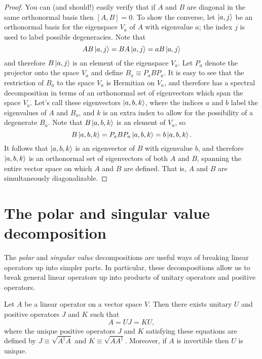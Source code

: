 \begin{proof}
  You can (and should!) easily verify that if $A$ and $B$ are diagonal in the
  same orthonormal basis then $[A, B] = 0$. To show the converse, let $\ket{a,
  j}$ be an orthonormal basis for the eigenspace $V_a$ of $A$ with eigenvalue
  $a$; the index $j$ is used to label possible degeneracies. Note that
  \begin{equation*}
    AB\ket{a, j} = BA\ket{a, j} = aB\ket{a, j}
  \end{equation*}
  and therefore $B\ket{a, j}$ is an element of the eigenspace $V_a$. Let $P_a$
  denote the projector onto the space $V_a$ and define $B_a \equiv P_aBP_a$.
  It is easy to see that the restriction of $B_a$ to the space $V_a$ is
  Hermitian on $V_a$, and therefore has a spectral decomposition in terms of
  an orthonormal set of eigenvectors which span the space $V_a$. Let's call
  these eigenvectors $\ket{a, b, k}$, where the indices $a$ and $b$ label the
  eigenvalues of $A$ and $B_a$, and $k$ is an extra index to allow for the
  possibility of a degenerate $B_a$. Note that $B\ket{a, b, k}$ is an element
  of $V_a$, so \begin{equation*}
    B\ket{a, b, k} = P_aBP_a\ket{a, b, k} = b\ket{a, b, k}.
  \end{equation*}
  It follows that $\ket{a, b, k}$ is an eigenvector of $B$ with eigenvalue $b$,
  and therefore $\ket{a, b, k}$ is an orthonormal set of eigenvectors of both
  $A$ and $B$, spanning the entire vector space on which $A$ and $B$ are
  defined. That is, $A$ and $B$ are simultaneously diagonalizable.
\end{proof}

\section{The polar and singular value decomposition}

The \emph{polar} and \emph{singular value} decompositions are useful ways of
breaking linear operators up into simpler parts. In particular, these
decompositions allow us to break general linear operators up into products of
unitary operators and positive operators.

\begin{theorem}
  Let $A$ be a linear operator on a vector space $V$. Then there exists unitary
  $U$ and positive operators $J$ and $K$ such that \begin{equation*}
    A = UJ = KU,
  \end{equation*}
  where the unique positive operators $J$ and $K$ satisfying these equations
  are defined by $J \equiv \sqrt{A^\dagger A}$ and $K \equiv \sqrt{A
  A^\dagger}$. Moreover, if $A$ is invertible then $U$ is unique.
\end{theorem}

